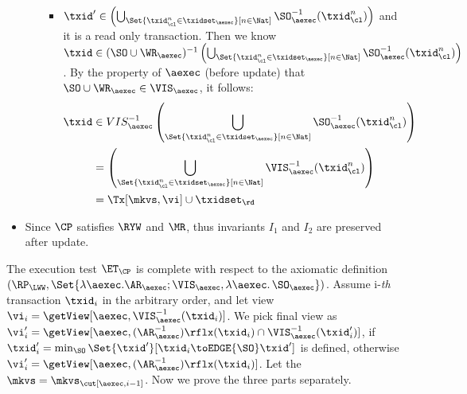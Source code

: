 \begin{itemize}
\begin{itemize}
\begin{itemize}
            \item \( \txid' \in  \left( \bigcup_{\Set{\txid_{\cl}^{n} \in \txidset_{\aexec} }[ n \in \Nat ]} \SO_{\aexec}^{-1}(\txid^n_\cl) \right) \) and it is a read only transaction.
                Then we know \( \txid \in (\SO \cup \WR_\aexec)^{-1} \left( \bigcup_{\Set{\txid_{\cl}^{n} \in \txidset_{\aexec} }[ n \in \Nat ]} \SO_{\aexec}^{-1}(\txid^n_\cl) \right) \).
                By the property of \( \aexec \) (before update) that \( \SO \cup \WR_\aexec \in \VIS_\aexec \),
                it follows:
                \begin{align*}
                    \txid & \in VIS_\aexec^{-1} \left( \bigcup_{\Set{\txid_{\cl}^{n} \in \txidset_{\aexec} }[ n \in \Nat ]} \SO_{\aexec}^{-1}(\txid^n_\cl) \right) \\
                          & = \left( \bigcup_{\Set{\txid_{\cl}^{n} \in \txidset_{\aexec} }[ n \in \Nat ]} \VIS_{\aexec}^{-1}(\txid^n_\cl) \right)  \\
                          & = \Tx[\mkvs,\vi] \cup \txidset_\rd
                \end{align*}
                
        \end{itemize}
    \end{itemize}

\item Since \( \CP \) satisfies \( \RYW \) and \( \MR \), thus invariants \( I_1 \) and  \( I_2 \) are preserved after update.

\end{itemize}
    


The execution test $\ET_\CP$ is complete with respect to the axiomatic definition 
\( (\RP_{\LWW}, \Set{\lambda \aexec.  \AR_\aexec ; \VIS_{\aexec}, \lambda \aexec \ldotp \SO_\aexec })\).
Assume i-\emph{th} transaction \( \txid_i \) in the arbitrary order,
and let view \( \vi_{i} = \getView[\aexec, \VIS^{-1}_{\aexec}(\txid_{i})] \).
We pick final view as \( \vi'_{i} = \getView[\aexec, (\AR^{-1}_{\aexec})\rflx(\txid_{i}) \cap \VIS_{\aexec}^{-1}(\txid'_i)] \),
if \( \txid'_i = \min_{\SO}\Set{\txid'}[\txid_i \toEDGE{\SO} \txid' ]\) is defined,
otherwise  \( \vi'_{i} = \getView[\aexec, (\AR^{-1}_{\aexec})\rflx(\txid_{i})]\).
Let the \( \mkvs = \mkvs_{\cut[\aexec, i-1]} \).
Now we prove the three parts separately.

